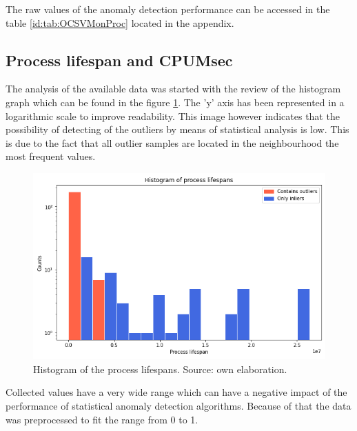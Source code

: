 \documentclass[a4paper,twoside,12pt]{book}
\begin{document}
The raw values of the anomaly detection performance can be accessed in the table \ref{id:tab:OCSVMonProc} located in the 
appendix. 

\subsection{Process lifespan and CPUMsec}
The analysis of the available data was started with the review of the histogram graph which can be found in the 
figure \ref{fig:lifespanHist}. The 'y' axis has been represented in a logarithmic scale to improve readability.
This image however indicates that the possibility of detecting of the outliers by means of statistical
analysis is low. This is due to the fact that all outlier samples are located in the neighbourhood the most frequent values. 

\begin{figure}
	\centering
	\includegraphics[scale=0.9]{images/LifespanHist}
	\caption{Histogram of the process lifespans. Source: own elaboration.}
	\label{fig:lifespanHist}
 \end{figure}


Collected values have a very wide range which can have a negative impact of the performance of statistical anomaly detection algorithms.
Because of that the data was preprocessed to fit the range from 0 to 1. 
\end{document}
